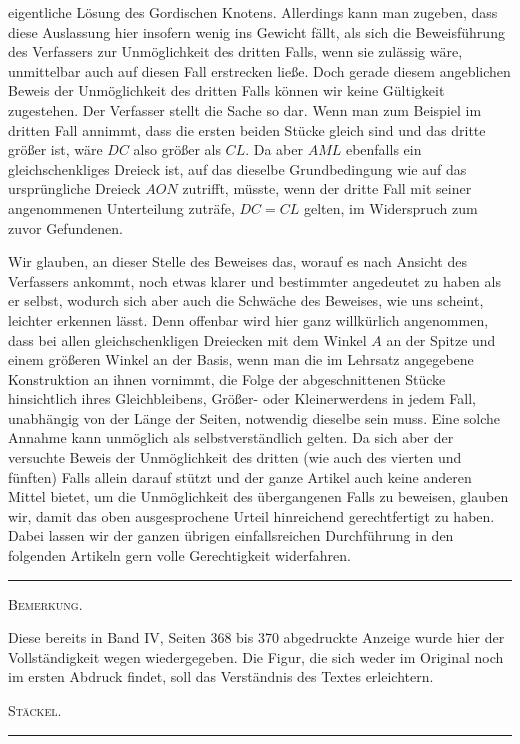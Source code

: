 eigentliche Lösung des Gordischen Knotens. Allerdings kann man zugeben, dass diese Auslassung
hier insofern wenig ins Gewicht fällt, als sich die Beweisführung des Verfassers zur Unmöglichkeit des
dritten Falls, wenn sie zulässig wäre, unmittelbar auch auf diesen Fall erstrecken ließe.
Doch gerade diesem angeblichen Beweis der Unmöglichkeit des dritten Falls können wir keine
Gültigkeit zugestehen. Der Verfasser stellt die Sache so dar. Wenn man zum Beispiel im dritten Fall
annimmt, dass die ersten beiden Stücke gleich sind und das dritte größer ist, wäre
$DC$ also größer als $CL$. Da aber $AML$ ebenfalls ein gleichschenkliges Dreieck ist,
auf das dieselbe Grundbedingung wie auf das ursprüngliche Dreieck $AON$ zutrifft, müsste, wenn
der dritte Fall mit seiner angenommenen Unterteilung zuträfe, $DC=CL$ gelten,
im Widerspruch zum zuvor Gefundenen.

Wir glauben, an dieser Stelle des Beweises das, worauf es nach Ansicht des Verfassers ankommt, noch etwas
klarer und bestimmter angedeutet zu haben als er selbst,
wodurch sich aber auch die Schwäche des Beweises, wie uns scheint, leichter erkennen lässt. Denn
offenbar wird hier ganz willkürlich angenommen, dass bei allen gleichschenkligen Dreiecken mit
dem Winkel $A$ an der Spitze und einem größeren Winkel an der Basis, wenn man die im Lehrsatz
angegebene Konstruktion an ihnen vornimmt, die Folge der abgeschnittenen Stücke hinsichtlich
ihres Gleichbleibens, Größer- oder Kleinerwerdens in jedem Fall, unabhängig von der Länge
der Seiten, notwendig dieselbe sein muss. Eine solche Annahme kann unmöglich als selbstverständlich
gelten. Da sich aber der versuchte Beweis der
Unmöglichkeit des dritten (wie auch des vierten und fünften) Falls allein darauf stützt und der ganze Artikel
auch keine anderen Mittel bietet, um die Unmöglichkeit des übergangenen Falls zu beweisen,
glauben wir, damit das oben ausgesprochene Urteil hinreichend gerechtfertigt zu haben.
Dabei lassen wir der ganzen übrigen einfallsreichen Durchführung in den folgenden
Artikeln gern volle Gerechtigkeit widerfahren.

\begin{center}\rule{3cm}{0.4pt}\end{center}

\begin{center}\textsc{Bemerkung.}\end{center}

{\small
Diese bereits in Band IV, Seiten 368 bis 370 abgedruckte Anzeige wurde hier der Vollständigkeit
wegen wiedergegeben. Die Figur, die sich weder im Original noch im ersten
Abdruck findet, soll das Verständnis des Textes erleichtern.

\begin{flushright}\textsc{Stäckel.}\end{flushright}
}

\begin{center}\rule{3cm}{0.4pt}\end{center}

